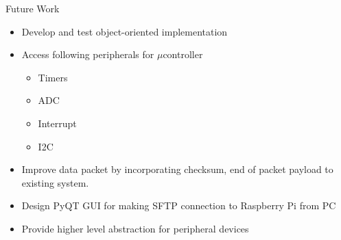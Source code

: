 \documentclass[10pt,handout,english]{beamer}
\begin{document}
\begin{frame}{Future Work}
\begin{itemize}
\item Develop and test object-oriented implementation
\item Access following peripherals for ${\mu}$controller
	\begin{itemize}
	\item Timers
	\item ADC
	\item Interrupt
	\item I2C
	\end{itemize}
\item Improve data packet by incorporating checksum, end of packet payload to existing system.
\item Design PyQT GUI for making SFTP connection to Raspberry Pi from PC
\item Provide higher level abstraction for peripheral devices  
\end{itemize}

\end{frame}
\end{document}

